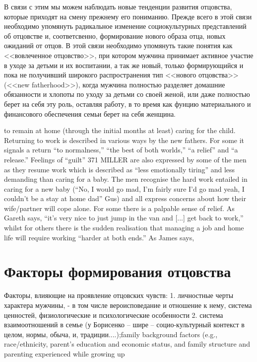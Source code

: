 \documentclass{../../common/thesisbyxetex}
\begin{document}
В связи с этим мы можем наблюдать новые тенденции развития отцовства, которые приходят на смену
прежнему его пониманию. Прежде всего в этой связи необходимо упомянуть радикальное изменение
социокультурных представлений об отцовстве и, соответсвенно, формирование нового образа отца, новых
ожиданий от отцов. В этой связи необходимо упомянуть такие понятия как <<вовлеченное отцовство>>,
при котором мужчина принимает активное участие в уходе за детьми и их воспитании, а так же
новый,  только формирующийся и пока не получивший широкого распространения  тип <<нового
отцовства>> (<<new fatherhood>>), когда мужчина полностью разделяет домашние обязанности и хлопоты
по уходу за детьми со своей женой, или даже полностью берет на себя эту роль, оставляя работу, в то
время как фунцию материального и финансового обеспечения семьи берет на себя женщина.

to remain at home (through the initial months at least) caring for the child. Returning
to work is described in various ways by the new fathers. For some it signals a return
“to normalness,” “the best of both worlds,” “a relief” and “a release.” Feelings of “guilt”
371
MILLER
are also expressed by some of the men as they resume work which is described as “less
emotionally tiring” and less demanding than caring for a baby. The men recognise the
hard work entailed in caring for a new baby (“No, I would go mad, I’m fairly sure I’d
go mad yeah, I couldn’t be a stay at home dad” Gus) and all express concerns about how
their wife/partner will cope alone. For some there is a palpable sense of relief. As
Gareth says, “it’s very nice to just jump in the van and [...] get back to work,” whilst
for others there is the sudden realisation that managing a job and home life will require
working “harder at both ends.”\cite[370-371]{tri} As James says,


\section{Факторы формирования отцовства}


Факторы, влияющие на проявление отцовских чувств:
1. личностные черты характера мужчины,
- в том числе вероисповедание и отношение к нему, система ценностей, физиологические и
психологические особенности
2. система взаимоотношений в семье (у Борисенко – шире – социо-культурный контекст в целом, нормы,
обыча, и, традиции....)\cite{psyot};family background factors (e.g.,
race/ethnicity, parent’s education and economic status, and
family structure and parenting experienced while growing up \cite[164]{long}
\end{document}
